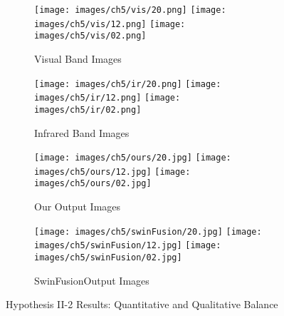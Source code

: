 \begin{figure}[htbp]
    \centering
    \begin{subfigure}[b]{\textwidth}
        \texttt{[image: images/ch5/vis/20.png]}
        \texttt{[image: images/ch5/vis/12.png]}
        \texttt{[image: images/ch5/vis/02.png]}
        \caption{Visual Band Images}
        \label{fig:ch5:met5:vis}
    \end{subfigure}
    \vspace{0.01cm}
    \begin{subfigure}[b]{\textwidth}
        \texttt{[image: images/ch5/ir/20.png]}
        \texttt{[image: images/ch5/ir/12.png]}
        \texttt{[image: images/ch5/ir/02.png]}
        \caption{Infrared Band Images}
        \label{fig:ch5:met5:ir}
    \end{subfigure}
    \vspace{0.01cm}
    \begin{subfigure}[b]{\textwidth}
        \texttt{[image: images/ch5/ours/20.jpg]}
        \texttt{[image: images/ch5/ours/12.jpg]}
        \texttt{[image: images/ch5/ours/02.jpg]}
        \caption{Our Output Images}
        \label{fig:ch5:met5:ours}
    \end{subfigure}
    \vspace{0.01cm}
    \begin{subfigure}[b]{\textwidth}
        \texttt{[image: images/ch5/swinFusion/20.jpg]}
        \texttt{[image: images/ch5/swinFusion/12.jpg]}
        \texttt{[image: images/ch5/swinFusion/02.jpg]}
        \caption{SwinFusion\cite{ma2022swinfusion}Output Images}
        \label{fig:ch5:met5:swin}
    \end{subfigure}
    \caption{Hypothesis II-2 Results: Quantitative and Qualitative Balance}
    \label{fig:ch5:met5}
\end{figure}

